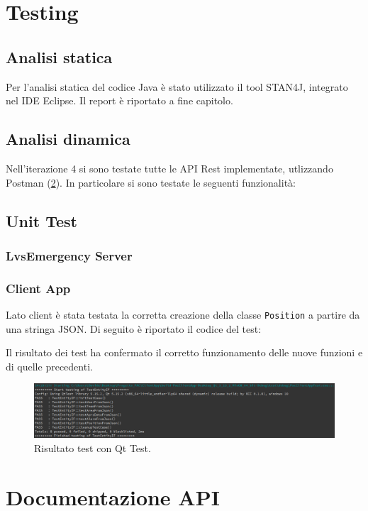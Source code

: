 \section{Testing}
\subsection{Analisi statica}
Per l'analisi statica del codice Java è stato utilizzato il tool STAN4J, integrato nel IDE Eclipse. Il report è riportato a fine capitolo.

\subsection{Analisi dinamica}
Nell'iterazione 4 si sono testate tutte le API Rest implementate, utlizzando Postman (\Fig \ref{}). In particolare si sono testate le seguenti funzionalità:


\clearpage

\subsection{Unit Test}
\subsubsection{LvsEmergency Server}



\clearpage

\subsubsection{Client App}
Lato client è stata testata la corretta creazione della classe \texttt{Position} a partire da una stringa JSON. Di seguito è riportato il codice del test: 



Il risultato dei test ha confermato il corretto funzionamento delle nuove funzioni e di quelle precedenti. 

\begin{figure}[h!]
	\centering
	\includegraphics[width=1\linewidth]{./Iterazione 4/ImageFiles/testcpp}
	\caption{Risultato test con Qt Test.}
	\label{fig:RisultatiTestQtIT4}
\end{figure}
\clearpage

\section{Documentazione API}
